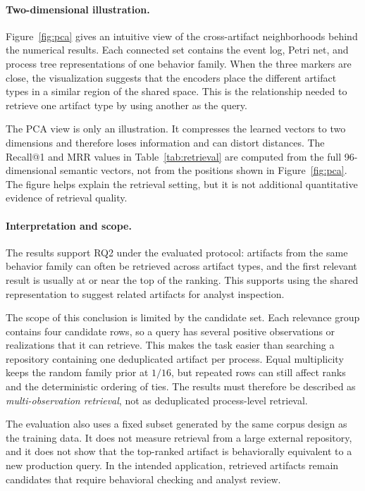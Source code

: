 \documentclass[mathematics,article,submit,moreauthors]{Definitions/mdpi}
\begin{document}


\paragraph{Two-dimensional illustration.}
Figure~\ref{fig:pca} gives an intuitive view of the cross-artifact neighborhoods behind the numerical results. Each connected set contains the event log, Petri net, and process tree representations of one behavior family. When the three markers are close, the visualization suggests that the encoders place the different artifact types in a similar region of the shared space. This is the relationship needed to retrieve one artifact type by using another as the query.



The PCA view is only an illustration. It compresses the learned vectors to two dimensions and therefore loses information and can distort distances. The Recall@1 and MRR values in Table~\ref{tab:retrieval} are computed from the full 96-dimensional semantic vectors, not from the positions shown in Figure~\ref{fig:pca}. The figure helps explain the retrieval setting, but it is not additional quantitative evidence of retrieval quality.

\paragraph{Interpretation and scope.}
The results support RQ2 under the evaluated protocol: artifacts from the same behavior family can often be retrieved across artifact types, and the first relevant result is usually at or near the top of the ranking. This supports using the shared representation to suggest related artifacts for analyst inspection.

The scope of this conclusion is limited by the candidate set. Each relevance group contains four candidate rows, so a query has several positive observations or realizations that it can retrieve. This makes the task easier than searching a repository containing one deduplicated artifact per process. Equal multiplicity keeps the random family prior at $1/16$, but repeated rows can still affect ranks and the deterministic ordering of ties. The results must therefore be described as \emph{multi-observation retrieval}, not as deduplicated process-level retrieval.

The evaluation also uses a fixed subset generated by the same corpus design as the training data. It does not measure retrieval from a large external repository, and it does not show that the top-ranked artifact is behaviorally equivalent to a new production query. In the intended application, retrieved artifacts remain candidates that require behavioral checking and analyst review.
\end{document}
